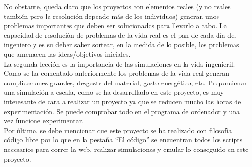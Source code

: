 \documentclass[11pt]{article}
\begin{document}
No obstante, queda claro que los proyectos con elementos reales (y no reales
también pero la resolución depende más de los individuos) generan unos problemas
importantes que deben ser solucionados para llevarlo a cabo. La capacidad de
resolución de problemas de la vida real es el pan de cada día del ingeniero y es
su deber saber sortear, en la medida de lo posible, los problemas que amenacen
las ideas/objetivos iniciales. \\

La segunda lección es la importancia de las simulaciones en la vida
ingenieril. Como se ha comentado anteriormente los problemas de la vida real
generan complicaciones grandes, desgaste del material, gasto energético,
etc. Proporcionar una simulación a escala, como se ha desarrollado en este
proyecto, es muy interesante de cara a realizar un proyecto ya que se reducen
mucho las horas de experimentación. Se puede comprobar todo en el programa de
ordenador y una vez funcione experimentar. \\

Por último, se debe mencionar que este proyecto se ha realizado con filosofía
código libre por lo que en la pestaña ``El código'' se encuentran todos los
scripts necesarios para correr la web, realizar simulaciones y emular lo
conseguido en este proyecto.


\pagebreak
\appendix

\end{document}
